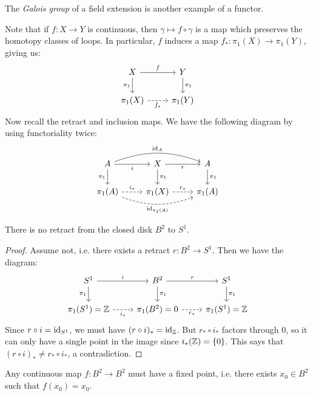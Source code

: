 \begin{remark}
  The \emph{Galois group} of a field extension is
  another example of a functor.
\end{remark}

\begin{example}
  Note that if $f : X \to Y$ is continuous, then
  $\gamma \mapsto f \circ \gamma$ is a map which
  preserves the homotopy classes of loops. In
  particular, $f$ induces a map $f_* : \pi_1(X) \to \pi_1(Y)$,
  giving us:
  \[
    \begin{tikzcd}
      X \ar[r, "f"] \ar[d, "\pi_1"'] & Y \ar[d, "\pi_1"] \\
      \pi_1(X) \ar[r, "f_*"', dashed] & \pi_1(Y)
    \end{tikzcd}
  \]
  Now recall the retract and inclusion maps.
  We have the following diagram by using
  functoriality twice:
  \[
    \begin{tikzcd}
      A \ar[r, "i", swap] \ar[rr, bend left=20, "\id_A"] \ar[d, "\pi_1"'] & X \ar[d, "\pi_1"] \ar[r, "r", swap] & A \ar[d, "\pi_1"] \\
      \pi_1(A) \ar[r, "i_*"', dashed, swap] \ar[rr, bend right=20, "\id_{\pi_1(A)}", dashed, swap] & \pi_1(X) \ar[r, "r_*", dashed] & \pi_1(A)
    \end{tikzcd}
  \]
\end{example}

\begin{theorem}[No retract]
  There is no retract from the closed disk
  $B^2$ to $S^1$.
\end{theorem}

\begin{proof}
  Assume not, i.e. there exists a retract $r : B^2 \to S^1$.
  Then we have the diagram:
  \[
    \begin{tikzcd}
      S^1 \ar[r, "i"] \ar[d, "\pi_1"'] & B^2 \ar[d, "\pi_1"] \ar[r, "r"] & S^1 \ar[d, "\pi_1"] \\
      \pi_1(S^1) = \Z \ar[r, "i_*"', dashed] & \pi_1(B^2) = 0 \ar[r, "r_*", swap, dashed] & \pi_1(S^1) = \Z
    \end{tikzcd}
  \]
  Since $r \circ i = \operatorname{id}_{S^1}$, we must
  have $(r \circ i)_* = \operatorname{id}_{\mathbb{Z}}$. But
  $r_* \circ i_*$ factors through $0$, so it can
  only have a single point in
  the image since $i_*(\mathbb{Z}) = \{0\}$. This
  says that $(r \circ i)_* \ne r_* \circ i_*$,
  a contradiction.
\end{proof}

\begin{theorem}
  Any continuous map $f : B^2 \to B^2$ must
  have a fixed point, i.e. there exists $x_0 \in B^2$
  such that $f(x_0) = x_0$.
\end{theorem}

